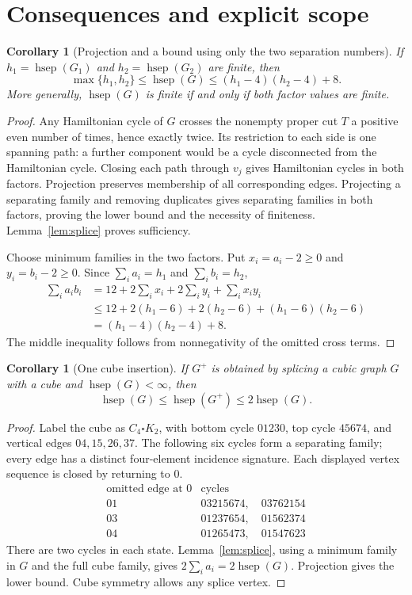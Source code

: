 \documentclass[10pt]{article}
\newtheorem{corollary}[lemma]{Corollary}
\newcommand{\hsep}{\operatorname{hsep}}
\begin{document}
\section{Consequences and explicit scope}
\begin{corollary}[Projection and a bound using only the two separation numbers]
\label{cor:scalar}
If $h_1=\hsep(G_1)$ and $h_2=\hsep(G_2)$ are finite, then
\begin{equation}\label{eq:scalar}
 \max\{h_1,h_2\}\le\hsep(G)\le(h_1-4)(h_2-4)+8.
\end{equation}
More generally, $\hsep(G)$ is finite if and only if both factor values are finite.
\end{corollary}
\begin{proof}
Any Hamiltonian cycle of $G$ crosses the nonempty proper cut $T$ a positive
even number of times, hence exactly twice. Its restriction to each side is
one spanning path: a further component would be a cycle disconnected from
the Hamiltonian cycle. Closing each path through $v_j$ gives Hamiltonian
cycles in both factors. Projection preserves membership of all corresponding
edges. Projecting a separating family and removing duplicates gives separating
families in both factors, proving the lower bound and the necessity of finiteness.
Lemma~\ref{lem:splice} proves sufficiency.

Choose minimum families in the two factors. Put $x_i=a_i-2\ge0$ and
$y_i=b_i-2\ge0$. Since $\sum_i a_i=h_1$ and $\sum_i b_i=h_2$,
\begin{align*}
 \sum_i a_i b_i
 &=12+2\sum_i x_i+2\sum_i y_i+\sum_i x_i y_i\\
 &\le12+2(h_1-6)+2(h_2-6)+(h_1-6)(h_2-6)\\
 &=(h_1-4)(h_2-4)+8.
\end{align*}
The middle inequality follows from nonnegativity of the omitted cross terms.
\end{proof}

\begin{corollary}[One cube insertion]\label{cor:cube}
If $G^+$ is obtained by splicing a cubic graph $G$ with a cube and
$\hsep(G)<\infty$, then
\[
 \hsep(G)\le\hsep(G^+)\le2\hsep(G).
\]
\end{corollary}
\begin{proof}
Label the cube as $C_4\square K_2$, with bottom cycle $01230$, top cycle
$45674$, and vertical edges $04,15,26,37$. The following six cycles form a
separating family; every edge has a distinct four-element incidence signature.
Each displayed vertex sequence is closed by returning to 0.
\[
\begin{array}{c|l}
\text{omitted edge at 0}&\text{cycles}\\\hline
01&03215674,\quad03762154\\
03&01237654,\quad01562374\\
04&01265473,\quad01547623
\end{array}
\]
There are two cycles in each state. Lemma~\ref{lem:splice}, using a minimum
family in $G$ and the full cube family, gives $2\sum_i a_i=2\hsep(G)$.
Projection gives the lower bound. Cube symmetry allows any splice vertex.
\end{proof}
\end{document}
